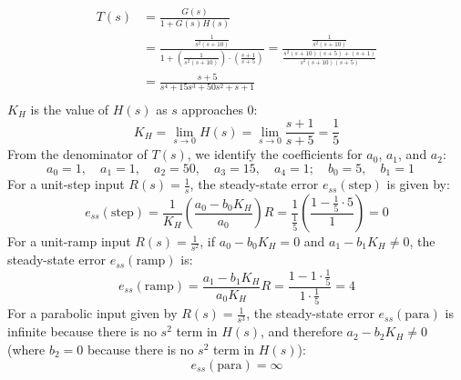 \documentclass[11pt]{article}
\begin{document}
\begin{align*}
T(s) &= \frac{G(s)}{1 + G(s)H(s)} \\
&= \frac{\frac{1}{s^2(s + 10)}}{1 + \left(\frac{1}{s^2(s + 10)}\right) \cdot \left(\frac{s + 1}{s + 5}\right)} = \frac{\frac{1}{s^2(s + 10)}}{\frac{s^2(s + 10)(s+5) + (s + 1)}{s^2(s + 10)(s + 5)}} \\
&= \frac{s+5}{s^4 + 15s^3 + 50s^2 + s + 1} \\
\end{align*}
\( K_H \) is the value of \( H(s) \) as \( s \) approaches 0:
\[
K_H = \lim_{{s \to 0}} H(s) = \lim_{{s \to 0}} \frac{s + 1}{s + 5} = \frac{1}{5}
\]
From the denominator of \( T(s) \), we identify the coefficients for \( a_0 \), \( a_1 \), and \( a_2 \):
\[
a_0 = 1, \quad a_1 = 1, \quad a_2 = 50, \quad a_3 = 15, \quad a_4 = 1; \quad b_0 = 5, \quad b_1 = 1 \quad
\]
For a unit-step input \( R(s) = \frac{1}{s} \), the steady-state error \( e_{ss}(\text{step}) \) is given by:
\[
e_{ss}(\text{step}) = \frac{1}{K_H} \left( \frac{a_0 - b_0K_H}{a_0} \right)R = \frac{1}{\frac{1}{5}} \left( \frac{1 - \frac{1}{5}\cdot 5}{1} \right) = 0
\]
For a unit-ramp input \( R(s) = \frac{1}{s^2} \), if \( a_0 - b_0K_H = 0 \) and \( a_1 - b_1K_H \neq 0 \), the steady-state error \( e_{ss}(\text{ramp}) \) is:
\[
e_{ss}(\text{ramp}) = \frac{a_1 - b_1K_H}{a_0K_H}R = \frac{1 - 1\cdot\frac{1}{5}}{1\cdot\frac{1}{5}} = 4
\]
For a parabolic input given by \( R(s) = \frac{1}{s^3} \), the steady-state error \( e_{ss}(\text{para}) \) is infinite because there is no \( s^2 \) term in \( H(s) \), and therefore \( a_2 - b_2K_H \neq 0 \) (where \( b_2 = 0 \) because there is no \( s^2 \) term in \( H(s) \)):
\[
e_{ss}(\text{para}) = \infty
\]

\newpage
\end{document}
